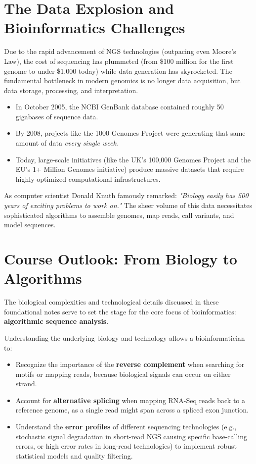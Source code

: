 \section{The Data Explosion and Bioinformatics Challenges}

Due to the rapid advancement of NGS technologies (outpacing even Moore's Law), the cost of sequencing has plummeted (from \$100 million for the first genome to under \$1,000 today) while data generation has skyrocketed. The fundamental bottleneck in modern genomics is no longer data acquisition, but data storage, processing, and interpretation.


\begin{itemize}
  \item In October 2005, the NCBI GenBank database contained roughly 50 gigabases of sequence data.
  \item By 2008, projects like the 1000 Genomes Project were generating that same amount of data \textit{every single week}.
  \item Today, large-scale initiatives (like the UK's 100,000 Genomes Project and the EU's 1+ Million Genomes initiative) produce massive datasets that require highly optimized computational infrastructures.
\end{itemize}

As computer scientist Donald Knuth famously remarked: \textit{"Biology easily has 500 years of exciting problems to work on."} The sheer volume of this data necessitates sophisticated algorithms to assemble genomes, map reads, call variants, and model sequences.

\section{Course Outlook: From Biology to Algorithms}

The biological complexities and technological details discussed in these foundational notes serve to set the stage for the core focus of bioinformatics: \textbf{algorithmic sequence analysis}.

Understanding the underlying biology and technology allows a bioinformatician to:
\begin{itemize}
  \item Recognize the importance of the \textbf{reverse complement} when searching for motifs or mapping reads, because biological signals can occur on either strand.
  \item Account for \textbf{alternative splicing} when mapping RNA-Seq reads back to a reference genome, as a single read might span across a spliced exon junction.
  \item Understand the \textbf{error profiles} of different sequencing technologies (e.g., stochastic signal degradation in short-read NGS causing specific base-calling errors, or high error rates in long-read technologies) to implement robust statistical models and quality filtering.
\end{itemize}

